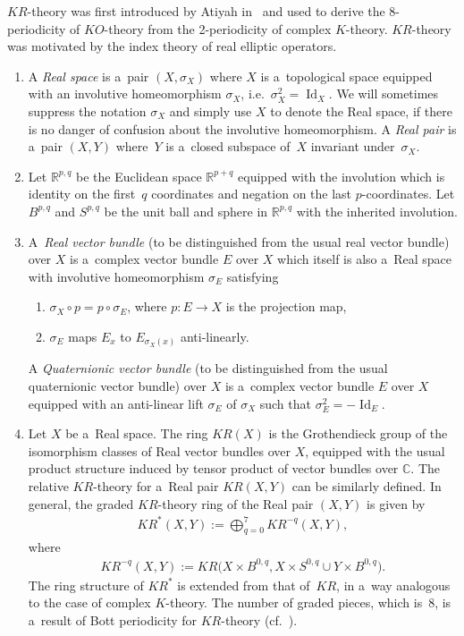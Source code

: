 \documentclass[11pt]{article}
\numberwithin{equation}{section}
\DeclareMathOperator{\Id}{Id}
\begin{document}
$KR$-theory was f\/irst introduced by Atiyah in~\cite{At3} and used to derive the 8-periodicity of $KO$-theory from the
2-periodicity of complex $K$-theory.
$KR$-theory was motivated by the index theory of real elliptic operators.
\begin{Definition}\label{krtheory}\quad
\begin{enumerate}\itemsep=0pt
\item
A \emph{Real space} is a~pair $(X,
\sigma_X)$ where $X$ is a~topological space equipped with an involutive homeomorphism $\sigma_X$, i.e.\
$\sigma_X^2=\Id
_X$.
We will sometimes suppress the notation $\sigma_X$ and simply use $X$ to denote the Real space,
if there is no danger of confusion about the involutive
homeomorphism.
A \emph{Real pair}
is a~pair $(X, Y)$ where~$Y$ is a~closed subspace of~$X$ invariant under~$\sigma_X$.
\item
Let $\mathbb{R}^{p, q}$ be the Euclidean space $\mathbb{R}^{p+q}$
equipped with the involution which is identity on the f\/irst~$q$
coordinates and negation on the last $p$-coordinates.
Let $B^{p, q}$ and $S^{p, q}$ be the unit ball and sphere in $\mathbb{R}^{p, q}$ with the inherited involution.
\item
A~\emph{Real vector bundle}
(to be distinguished from the usual real vector bundle) over $X$ is a~complex vector bundle
$E$ over $X$ which itself is also a~Real space with involutive homeomorphism $\sigma_E$ satisfying
\begin{enumerate}\itemsep=0pt
\item
$\sigma_X\circ p=p\circ\sigma_E$, where $p: E\to X$ is the projection map,
\item
$\sigma_E$ maps $E_x$ to $E_{\sigma_X(x)}$ anti-linearly.
\end{enumerate}
A \emph{Quaternionic vector bundle}
(to be distinguished from the usual quaternionic vector bundle) over $X$ is a~complex
vector bundle $E$ over $X$ equipped with an anti-linear lift $\sigma_E$ of $\sigma_X$ such that $\sigma_E^2=-\Id
_E$.
\item
Let $X$ be a~Real space.
The ring $KR(X)$ is the Grothendieck group of the isomorphism classes of Real vector bundles over $X$, equipped with the
usual product structure induced by tensor product of vector bundles over $\mathbb{C}$.
The relative $KR$-theory for a~Real pair $KR(X, Y)$ can be similarly def\/ined.
In general, the graded $KR$-theory ring of the Real pair $(X, Y)$ is given by
\begin{gather*}
KR^*(X, Y):=\bigoplus_{q=0}^7 KR^{-q}(X, Y),
\end{gather*}
where
\begin{gather*}
KR^{-q}(X, Y):=KR\big(X\times B^{0,q}, X\times S^{0, q}\cup Y\times B^{0,q}\big).
\end{gather*}
The ring structure of $KR^*$ is extended from that of~$KR$, in a~way analogous to the case of complex $K$-theory.
The number of graded pieces, which is~8, is a~result of Bott periodicity for $KR$-theory (cf.~\cite{At3}).
\end{enumerate}
\end{Definition}
\end{document}
